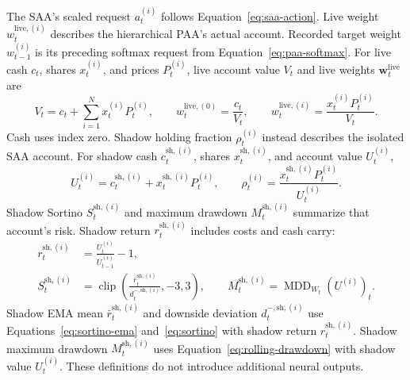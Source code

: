 The SAA's scaled request \(a_t^{(i)}\) follows Equation~\eqref{eq:saa-action}. Live weight \(w_t^{\mathrm{live},(i)}\) describes the hierarchical PAA's actual account. Recorded target weight \(w_{t-1}^{(i)}\) is its preceding softmax request from Equation~\eqref{eq:paa-softmax}. For live cash \(c_t\), shares \(x_t^{(i)}\), and prices \(P_t^{(i)}\), live account value \(V_t\) and live weights \(\mathbf w_t^{\mathrm{live}}\) are
\begin{equation}
V_t=c_t+\sum_{i=1}^{N}x_t^{(i)}P_t^{(i)},\qquad
w_t^{\mathrm{live},(0)}=\frac{c_t}{V_t},\qquad
w_t^{\mathrm{live},(i)}=\frac{x_t^{(i)}P_t^{(i)}}{V_t}.
\label{eq:paa-live-weights}
\end{equation}
Cash uses index zero. Shadow holding fraction \(\rho_t^{(i)}\) instead describes the isolated SAA account. For shadow cash \(c_t^{\mathrm{sh},(i)}\), shares \(x_t^{\mathrm{sh},(i)}\), and account value \(U_t^{(i)}\),
\begin{equation}
U_t^{(i)}=c_t^{\mathrm{sh},(i)}+x_t^{\mathrm{sh},(i)}P_t^{(i)},\qquad
\rho_t^{(i)}=\frac{x_t^{\mathrm{sh},(i)}P_t^{(i)}}{U_t^{(i)}}.
\label{eq:shadow-exposure}
\end{equation}
Shadow Sortino \(S_t^{\mathrm{sh},(i)}\) and maximum drawdown \(M_t^{\mathrm{sh},(i)}\) summarize that account's risk. Shadow return \(r_t^{\mathrm{sh},(i)}\) includes costs and cash carry:
\begin{equation}
\begin{aligned}
r_t^{\mathrm{sh},(i)}&=\frac{U_t^{(i)}}{U_{t-1}^{(i)}}-1,\\
S_t^{\mathrm{sh},(i)}&=\operatorname{clip}\!\left(
\frac{\bar r_t^{\mathrm{sh},(i)}}{d_t^{-,\mathrm{sh},(i)}},-3,3\right),\qquad
M_t^{\mathrm{sh},(i)}=\operatorname{MDD}_{W_t}(U^{(i)})_t.
\end{aligned}
\label{eq:shadow-risk}
\end{equation}
Shadow EMA mean \(\bar r_t^{\mathrm{sh},(i)}\) and downside deviation \(d_t^{-,\mathrm{sh},(i)}\) use Equations~\eqref{eq:sortino-ema} and~\eqref{eq:sortino} with shadow return \(r_t^{\mathrm{sh},(i)}\). Shadow maximum drawdown \(M_t^{\mathrm{sh},(i)}\) uses Equation~\eqref{eq:rolling-drawdown} with shadow value \(U_t^{(i)}\). These definitions do not introduce additional neural outputs.

